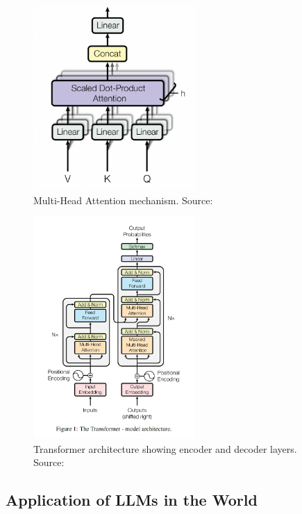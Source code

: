 \begin{figure}[h!]
    \centering
    \includegraphics[width=0.55\textwidth]{Assets/multi_head_attention.png}
    \caption{Multi-Head Attention mechanism. Source: \cite{vaswani2017attention}}
    \label{fig:multi_head_attention}
\end{figure}

\begin{figure}[h!]
    \centering
    \includegraphics[width=0.55\textwidth]{Assets/transformer_architecture.png}
    \caption{Transformer architecture showing encoder and decoder layers. Source: \cite{vaswani2017attention}}
    \label{fig:transformer_architecture}
\end{figure}

\subsection{Application of LLMs in the World}

